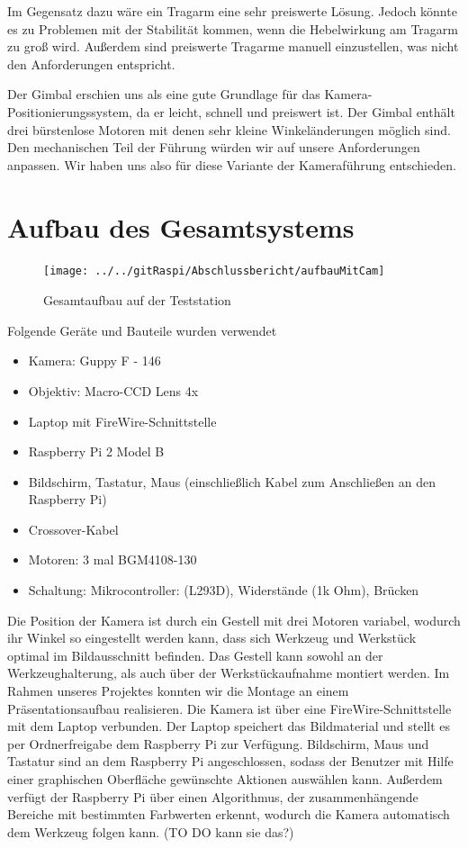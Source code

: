 \documentclass[12pt,a4paper,bibliography=totocnumbered,listof=totocnumbered]{scrartcl}
\begin{document}
Im Gegensatz dazu wäre ein Tragarm eine sehr preiswerte Lösung. Jedoch könnte es zu Problemen mit der Stabilität kommen, wenn die Hebelwirkung am Tragarm zu groß wird. Außerdem sind preiswerte Tragarme manuell einzustellen, was nicht den Anforderungen entspricht.

Der Gimbal erschien uns als eine gute Grundlage für das Kamera-Positionierungssystem, da er leicht, schnell und preiswert ist. Der Gimbal enthält drei bürstenlose Motoren mit denen sehr kleine Winkeländerungen möglich sind. Den mechanischen Teil der Führung würden wir auf unsere Anforderungen anpassen. Wir haben uns also für diese Variante der Kameraführung entschieden.

\section{Aufbau des Gesamtsystems}
\begin{figure}[th]
	\centering
	\texttt{[image: ../../gitRaspi/Abschlussbericht/aufbauMitCam]}
	\caption{Gesamtaufbau auf der Teststation}
	\label{fig:aufbaumitcam}
\end{figure}


Folgende Geräte und Bauteile wurden verwendet
\begin{itemize} 
\item Kamera: Guppy F - 146
\item Objektiv: Macro-CCD Lens 4x
\item Laptop mit FireWire-Schnittstelle
\item Raspberry Pi 2 Model B 
\item Bildschirm, Tastatur, Maus (einschließlich Kabel zum Anschließen an den Raspberry Pi)
\item Crossover-Kabel
\item Motoren: 3 mal BGM4108-130
\item Schaltung: Mikrocontroller: (L293D), Widerstände (1k Ohm), Brücken
\end{itemize}

Die Position der Kamera ist durch ein Gestell mit drei Motoren variabel, wodurch ihr Winkel so eingestellt werden kann, dass sich Werkzeug und Werkstück optimal im Bildausschnitt befinden. Das Gestell kann sowohl an der Werkzeughalterung, als auch über der Werkstückaufnahme montiert werden. Im Rahmen unseres Projektes konnten wir die Montage an einem Präsentationsaufbau realisieren.
Die Kamera ist über eine FireWire-Schnittstelle mit dem Laptop verbunden. Der Laptop speichert das Bildmaterial und stellt es per Ordnerfreigabe dem Raspberry Pi zur Verfügung. Bildschirm, Maus und Tastatur sind an dem Raspberry Pi angeschlossen, sodass der Benutzer mit Hilfe einer graphischen Oberfläche gewünschte Aktionen auswählen kann. Außerdem verfügt der Raspberry Pi über einen Algorithmus, der zusammenhängende Bereiche mit bestimmten Farbwerten erkennt, wodurch die Kamera automatisch dem Werkzeug folgen kann. (TO DO kann sie das?)
\end{document}
